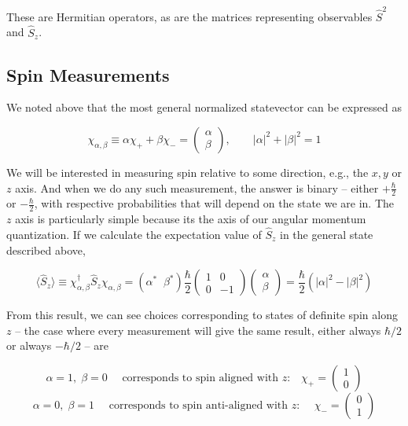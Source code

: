 These are Hermitian operators, as are the matrices representing observables
$\hat{S}^2$ and $\hat{S}_z$.


\subsection{Spin Measurements} 

We noted above that the most general normalized statevector can be expressed as 

\[
  \chi_{\alpha, \beta} \equiv \alpha \chi_+ + \beta \chi_- = \begin{pmatrix}
    \alpha \\ \beta
  \end{pmatrix} , \qquad |\alpha|^2 + |\beta|^2 = 1
\] \vspace{3px}

We will be interested in measuring spin relative to some direction, e.g., the
$x, y$ or $z$ axis. And when we do any such measurement, the answer is binary
-- either $+\frac{\hbar}{2}$ or $-\frac{\hbar}{2}$, with respective
probabilities that will depend on the state we are in. The $z$ axis is
particularly simple because its the axis of our angular momentum quantization.
If we calculate the expectation value of $\hat{S}_z$ in the general state
described above,
 
\[
  \langle \hat{S}_z \rangle \equiv \chi_{\alpha, \beta}^\dagger \hat{S}_z
  \chi_{\alpha, \beta} = (\alpha^* \; \; \beta^*) \frac{\hbar}{2} \begin{pmatrix}
    1 & 0 \\ 0 & -1
  \end{pmatrix} \begin{pmatrix}
    \alpha \\ \beta
  \end{pmatrix} = \frac{\hbar}{2} (|\alpha|^2 - |\beta|^2 )
\] \vspace{3px}

From this result, we can see choices corresponding to states of definite spin
along $z$ -- the case where every measurement will give the same result, either
always $\hbar / 2$ or always $-\hbar / 2$ -- are 

\[
\alpha =1, \; \beta = 0 \quad \text{ corresponds to spin aligned with $z $:
} \quad \chi_+ =  \begin{pmatrix}
  1\\0
\end{pmatrix} 
\] \[ \alpha = 0, \; \beta = 1 \quad \text{ corresponds to spin anti-aligned
with $z$: } \quad \chi_- = \begin{pmatrix}
  0 \\ 1
\end{pmatrix} \] \vspace{3px}


